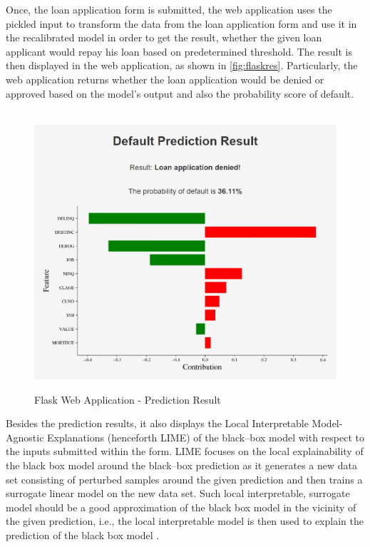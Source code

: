 Once, the loan application form is submitted, the web application uses the pickled input to transform the data from the loan application form and use it in the recalibrated model in order to get the result, whether the given loan applicant would repay his loan based on predetermined threshold. The result is then displayed in the web application, as shown in \autoref{fig:flaskres}.
Particularly, the web application returns whether the loan application would be denied or approved based on the model's output and also the probability score of default.

\begin{figure}[H]
\centering
\caption{Flask Web Application - Prediction Result}\vspace{0.5em}
\label{fig:flaskres}\
\includegraphics[width=130mm]{Figures/flask_app_result.jpg}

\vspace{-1em}
\end{figure}

Besides the prediction results, it also displays the Local Interpretable Model-Agnostic Explanations (henceforth LIME) of the black--box model with respect to the inputs submitted within the form.
LIME focuses on the local explainability of the black box model around the black--box prediction as it generates a new data set consisting of perturbed samples around the given prediction and then trains a surrogate linear model on the new data set.
Such local interpretable, surrogate model should be a good approximation of the black box model in the vicinity of the given prediction, i.e., the local interpretable model is then used to explain the prediction of the black box model \citep{ribeiro2016should}.

